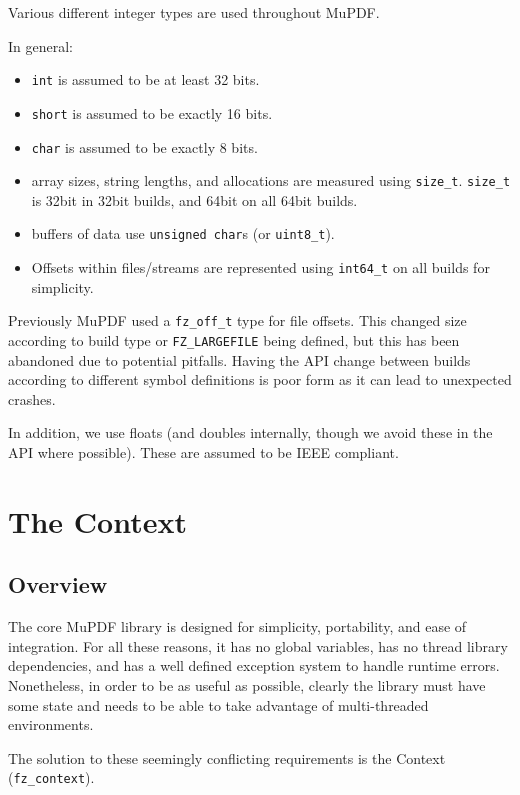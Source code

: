 \documentclass[oneside]{book}
\begin{document}
Various different integer types are used throughout MuPDF.

In general:

\begin{itemize}
\item \texttt{int} is assumed to be at least 32 bits.
\item \texttt{short} is assumed to be exactly 16 bits.
\item \texttt{char} is assumed to be exactly 8 bits.
\item array sizes, string lengths, and allocations are measured using \texttt{size\_t}. \texttt{size\_t} is 32bit in 32bit builds, and 64bit on all 64bit builds.
\item buffers of data use \texttt{unsigned char}s (or \texttt{uint8\_t}).
\item Offsets within files/streams are represented using \texttt{int64\_t} on all builds for simplicity.
\end{itemize}

Previously MuPDF used a \texttt{fz\_off\_t} type for file offsets. This changed size according to build type or \texttt{FZ\_LARGEFILE} being defined, but this has been abandoned due to potential pitfalls. Having the API change between builds according to different symbol definitions is poor form as it can lead to unexpected crashes.

In addition, we use floats (and doubles internally, though we avoid these in the API where possible). These are assumed to be IEEE compliant.

\chapter{The Context}
\label{Context}

\section{Overview}

The core MuPDF library is designed for simplicity, portability, and ease of integration. For all these reasons, it has no global variables, has no thread library dependencies, and has a well defined exception system to handle runtime errors. Nonetheless, in order to be as useful as possible, clearly the library must have some state and needs to be able to take advantage of multi-threaded environments.

The solution to these seemingly conflicting requirements is the Context (\texttt{fz\_context}).
\end{document}
